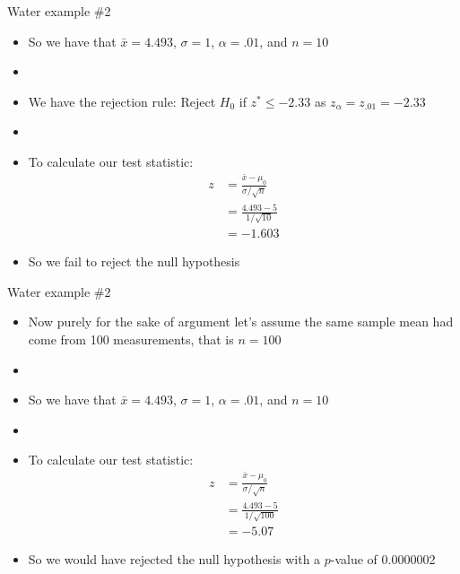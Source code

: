 \documentclass[xcolor=dvipsnames]{beamer}
\begin{document}
\begin{frame}{Water example \#2}
	\begin{itemize}
		\item So we have that $\bar{x} = 4.493$, $\sigma = 1$, $\alpha = .01$, and $n = 10$
		\item[]
		\item We have the rejection rule: Reject $H_0$ if $z^* \leq -2.33$ as  $z_{\alpha} = z_{.01}= -2.33$
		\item[]
		\item To calculate our test statistic:
		\begin{align*}
			z &= \frac{\bar{x}-\mu_0}{\sigma / \sqrt{n}} \\
			&=\frac{4.493-5}{1 / \sqrt{10}} \\
			&= -1.603
		\end{align*}
		\item So we fail to reject the null hypothesis
	\end{itemize}
\end{frame}

\begin{frame}{Water example \#2}
	\begin{itemize}
		\item Now purely for the sake of argument let's assume the same sample mean had come from 100 measurements, that is $n = 100$
		\item[]
		\item So we have that $\bar{x} = 4.493$, $\sigma = 1$, $\alpha = .01$, and $n = 10$
		\item[]
		\item To calculate our test statistic:
		\begin{align*}
		z &= \frac{\bar{x}-\mu_0}{\sigma / \sqrt{n}} \\
		&=\frac{4.493-5}{1 / \sqrt{100}} \\
		&= -5.07
		\end{align*}
		\item So we would have rejected the null hypothesis with a $p$-value of 0.0000002
	\end{itemize}
\end{frame}
\end{document}
